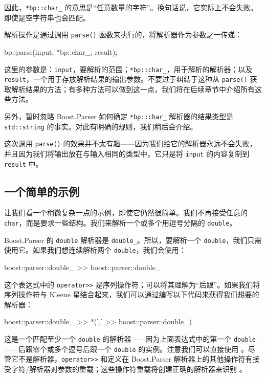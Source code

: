 因此，\texttt{*bp::char\_} 的意思是“任意数量的字符”。换句话说，它实际上不会失败。即使是空字符串也会匹配。

解析操作是通过调用 \texttt{parse()} 函数来执行的，将解析器作为参数之一传递：

\begin{code}
bp::parse(input, *bp::char_, result);
\end{code}

这里的参数是：\texttt{input}，要解析的范围；\texttt{*bp::char\_}，用于解析的解析器；以及 \texttt{result}，一个用于存放解析结果的输出参数。不要过于纠结于这种从 \texttt{parse()} 获取解析结果的方法；有多种方法可以做到这一点，我们将在后续章节中介绍所有这些方法。

另外，暂时忽略 Boost.Parser 如何确定 \texttt{*bp::char\_} 解析器的结果类型是 \texttt{std::string} 的事实。对此有明确的规则，我们稍后会介绍。

这次调用 \texttt{parse()} 的效果并不太有趣——因为我们给它的解析器永远不会失败，并且因为我们将输出放在与输入相同的类型中，它只是将 \texttt{input} 的内容复制到 \texttt{result} 中。

\subsection{一个简单的示例}

让我们看一个稍微复杂一点的示例，即使它仍然很简单。我们不再接受任意的 \texttt{char}，而是要求一些结构。我们来解析一个或多个用逗号分隔的 \texttt{double}。

Boost.Parser 的 \texttt{double} 解析器是 \texttt{double\_}。所以，要解析一个 \texttt{double}，我们只需使用它。如果我们想连续解析两个 \texttt{double}，我们会使用：

\begin{code}
boost::parser::double_ >> boost::parser::double_
\end{code}

这个表达式中的 \texttt{operator>>} 是序列操作符；可以将其理解为“后跟”。如果我们将序列操作符与 Kleene 星结合起来，我们可以通过编写以下代码来获得我们想要的解析器：

\begin{code}
boost::parser::double_ >> *(',' >> boost::parser::double_)
\end{code}

这是一个匹配至少一个 \texttt{double} 的解析器——因为上面表达式中的第一个 \texttt{double\_}——后跟零个或多个逗号后跟一个 \texttt{double} 的实例。注意我们可以直接使用 。尽管它不是解析器，\texttt{operator>>} 和定义在 Boost.Parser 解析器上的其他操作符有接受字符/解析器对参数的重载；这些操作符重载将创建正确的解析器来识别 。

